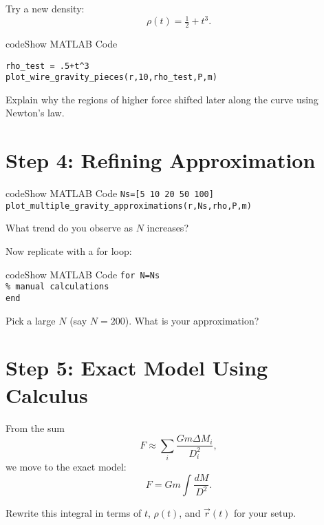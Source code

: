 \documentclass{ximera}
\begin{document}
Try a new density:
\[
\rho(t) = \tfrac{1}{2}+t^3.
\]

\begin{expandable}{code}{Show MATLAB Code}
\begin{verbatim}
rho_test = .5+t^3
plot_wire_gravity_pieces(r,10,rho_test,P,m)
\end{verbatim}
\end{expandable}

\begin{problem}
Explain why the regions of higher force shifted later along the curve using Newton's law. 
\end{problem}

\section*{Step 4: Refining Approximation}

\begin{expandable}{code}{Show MATLAB Code}
\texttt{Ns=[5 10 20 50 100]}\\
\texttt{plot\_multiple\_gravity\_approximations(r,Ns,rho,P,m)}
\end{expandable}

\begin{problem}
What trend do you observe as $N$ increases? 
\end{problem}

Now replicate with a for loop:

\begin{expandable}{code}{Show MATLAB Code}
\texttt{for N=Ns}\\
\quad \texttt{\% manual calculations}\\
\texttt{end}
\end{expandable}

\begin{problem}
Pick a large $N$ (say $N=200$). What is your approximation? 
\end{problem}

\section*{Step 5: Exact Model Using Calculus}

From the sum
\[
F \approx \sum_i \frac{G m \Delta M_i}{D_i^2},
\]
we move to the exact model:
\[
F = Gm \int \frac{dM}{D^2}.
\]

\begin{problem}
Rewrite this integral in terms of $t$, $\rho(t)$, and $\vec{r}(t)$ for your setup. 
\end{problem}
\end{document}

